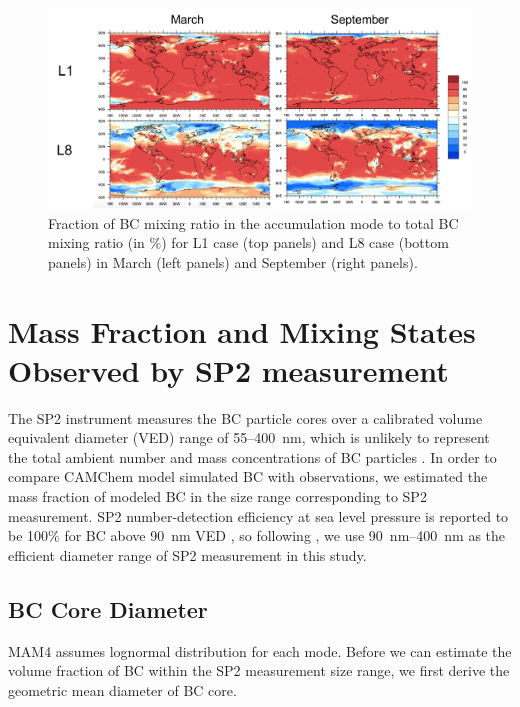 \documentclass[12pt, fullpage]{uiucthesis2009}
\begin{document}
	\begin{figure}[h] 
		\begin{center}
			\includegraphics[width = 1\textwidth]{Figure19}
			\caption[Fraction of BC mixing ratio in the accumulation mode to total BC mixing ratio (in $\%$) for L1 case (top panels) and L8 case (bottom panels) in March (left panels) and September (right panels)]{\label{fig_P19} Fraction of BC mixing ratio in the accumulation mode to total BC mixing ratio (in $\%$) for L1 case (top panels) and L8 case (bottom panels) in March (left panels) and September (right panels).}
		\end{center}
	\end{figure}
	
	\section{Mass Fraction and Mixing States Observed by SP2 measurement}
	The SP2 instrument measures the BC particle cores over a calibrated volume equivalent diameter (VED) range of 55--400~nm, which is unlikely to represent the total
	ambient number and mass concentrations of BC particles \citep{Reddington2013}. In order to compare CAMChem model simulated BC with observations, we estimated the mass fraction of modeled BC in the size range corresponding to SP2 measurement. SP2 number-detection efficiency at sea level pressure is reported to be 100$\%$ for BC above 90~nm VED \citep{schwarz2010global}, so following \cite{Reddington2013}, we use 90~nm--400~nm as the efficient diameter range of SP2 measurement in this study.
	
	\subsection{BC Core Diameter} 
	MAM4 assumes lognormal distribution for each mode. Before we can estimate the volume fraction of BC within the SP2 measurement size range, we first derive the geometric mean diameter of BC core. 
	
\end{document}
